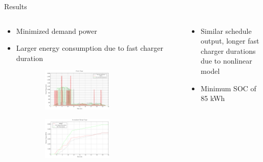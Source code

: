 \documentclass[aspectratio=169,dvipsnames]{beamer}
\begin{document}
\begin{frame}[label={sec:org286c646}]{Results}
\begin{columns}
\begin{column}{0.5\columnwidth}
{\scriptsize
\begin{itemize}
\item Minimized demand power
\item Larger energy consumption due to fast charger duration
\end{itemize}
}

\begin{figure}
\begin{subfigure}[t]{\textwidth}
\centering
    \includegraphics[width=0.7\textwidth]{img/sa-nonlinear/power-sa-nonlinear}
\end{subfigure}
\begin{subfigure}[t]{\textwidth}
\centering
    \includegraphics[width=0.7\textwidth]{img/sa-nonlinear/energy-sa-nonlinear}
\end{subfigure}
\end{figure}
\end{column}

\begin{column}{0.5\columnwidth}
{\scriptsize
\begin{itemize}
\item Similar schedule output, longer fast charger durations due to nonlinear model
\item Minimum SOC of 85 kWh
\end{itemize}
}


\end{column}
\end{columns}
\end{frame}
\end{document}
